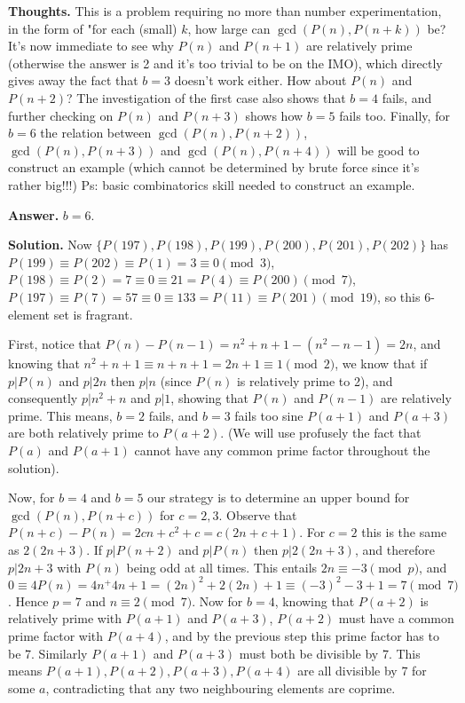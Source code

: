 \documentclass[11pt,a4paper]{article}
\begin{document}
\begin{itemize}
\textbf{Thoughts.} This is a problem requiring no more than number experimentation, in the form of "for each (small) $k$, how large can $\gcd(P(n), P(n+k))$ be? 
It's now immediate to see why $P(n)$ and $P(n+1)$ are relatively prime (otherwise the answer is 2 and it's too trivial to be on the IMO), which directly gives away the fact that $b=3$ doesn't work either. 
How about $P(n)$ and $P(n+2)$? The investigation of the first case also shows that $b=4$ fails, and further checking on $P(n)$ and $P(n+3)$ shows how $b=5$ fails too. 
Finally, for $b=6$ the relation between $\gcd(P(n), P(n+2))$, $\gcd(P(n), P(n+3))$ and $\gcd(P(n), P(n+4))$ will be good to construct an example (which cannot be determined by brute force since it's rather big!!!)
Ps: basic combinatorics skill needed to construct an example. 

\textbf{Answer.} $b=6.$

\textbf{Solution.}
Now $\{P(197), P(198), P(199), P(200), P(201), P(202)\}$ has 
$P(199)\equiv P(202)\equiv P(1)=3\equiv 0\pmod{3}$, 
$P(198)\equiv P(2)=7\equiv 0\equiv 21=P(4)\equiv P(200)\pmod {7}$, 
$P(197)\equiv P(7)=57\equiv 0\equiv 133=P(11)\equiv P(201)\pmod{19}$, so this 6-element set is fragrant. 

First, notice that $P(n)-P(n-1)=n^2+n+1-(n^2-n-1)=2n$, 
and knowing that $n^2+n+1\equiv n+n+1=2n+1\equiv 1\pmod{2}$, 
we know that if $p|P(n)$ and $p|2n$ then $p|n$ (since $P(n)$ is relatively prime to 2), 
and consequently $p|n^2+n$ and $p|1$, showing that $P(n)$ and $P(n-1)$ are relatively prime. 
This means, $b=2$ fails, and $b=3$ fails too sine $P(a+1)$ and $P(a+3)$ are both relatively prime to $P(a+2)$. 
(We will use profusely the fact that $P(a)$ and $P(a+1)$ cannot have any common prime factor throughout the solution). 

Now, for $b=4$ and $b=5$ our strategy is to determine an upper bound for $\gcd(P(n), P(n+c))$ for $c=2, 3$. 
Observe that $P(n+c)-P(n)=2cn+c^2+c=c(2n+c+1)$. 
For $c=2$ this is the same as $2(2n+3)$. 
If $p|P(n+2)$ and $p|P(n)$ then $p|2(2n+3)$, and therefore $p|2n+3$ with $P(n)$ being odd at all times. 
This entails $2n\equiv -3\pmod{p}$, 
and $0\equiv 4P(n)=4n^+4n+1=(2n)^2+2(2n)+1\equiv (-3)^2-3+1=7\pmod{7}$. 
Hence $p=7$ and $n\equiv 2\pmod{7}$. 
Now for $b=4$, knowing that $P(a+2)$ is relatively prime with $P(a+1)$ and $P(a+3)$, $P(a+2)$ must have a common prime factor with $P(a+4)$, 
and by the previous step this prime factor has to be 7. 
Similarly $P(a+1)$ and $P(a+3)$ must both be divisible by 7. 
This means $P(a+1), P(a+2), P(a+3), P(a+4)$ are all divisible by 7 for some $a$, contradicting that any two neighbouring elements are coprime. 


\end{itemize}
\end{document}
